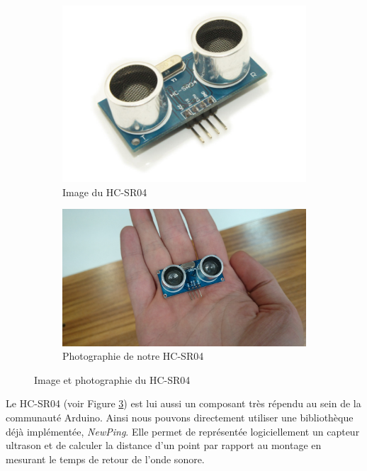 \documentclass[a4paper,10pt]{report}
\begin{document}
	\begin{figure}
	  \begin{subfigure}{.5\textwidth}
	    \centering
	    \includegraphics[scale=0.2]{img/image_hcsr04.jpg}
	    \caption{Image du HC-SR04}
	    \label{imagehcsr04}
	  \end{subfigure}%
	  \begin{subfigure}{.5\textwidth}
	    \centering
	    \includegraphics[scale=0.06]{img/hcsr04.JPG}
	    \caption{Photographie de notre HC-SR04}
	    \label{photohcsr04}
	  \end{subfigure}
	  \caption{Image et photographie du HC-SR04}
	  \label{hcsr04}
	\end{figure}
	
	Le HC-SR04 (voir Figure \ref{hcsr04}) est lui aussi un composant très 
répendu au sein de la communauté Arduino. Ainsi nous pouvons directement 
utiliser une bibliothèque déjà implémentée, \textit{NewPing}\cite{newping}. 
Elle permet de représentée logiciellement un capteur ultrason et de calculer la 
distance d'un point par rapport au montage en mesurant le temps de retour de 
l'onde sonore.
	
\end{document}
